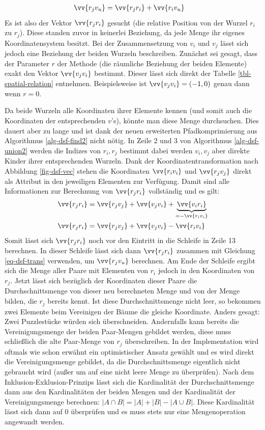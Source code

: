 \documentclass{whswinvcbook}
\begin{document}
\begin{align}\label{eq-dsf-trans}
    \vv{r_j v_u}&=\vv{r_j r_i}+\vv{r_i v_u}
\end{align}
Es ist also der Vektor $\vv{r_j r_i}$ gesucht (die relative Position von der Wurzel $r_i$ zu $r_j$). Diese standen zuvor in keinerlei Beziehung, da jede Menge ihr eigenes Koordinatensystem besitzt. Bei der Zusammensetzung von $v_i$ und $v_j$ lässt sich jedoch eine Beziehung der beiden Wurzeln beschreiben. Zunächst sei gesagt, dass der Parameter $r$ der Methode (die räumliche Beziehung der beiden Elemente) exakt den Vektor $\vv{v_j v_i}$ bestimmt. Dieser lässt sich direkt der Tabelle \ref{tbl-spatial-relation} entnehmen. Beispielsweise ist $\vv{v_j v_i}=(-1,0)$ genau dann wenn $r=0$.

Da beide Wurzeln alle Koordinaten ihrer Elemente kennen (und somit auch die Koordinaten der entsprechenden $v$'s), könnte man diese Menge durchsuchen. Dies dauert aber zu lange und ist dank der neuen erweiterten Pfadkomprimierung aus Algorithmus \ref{alg-dsf-find2} nicht nötig. In Zeile 2 und 3 von Algorithmus \ref{alg-dsf-union2} werden die Indizes von $r_i,r_j$ bestimmt dabei werden $v_i,v_j$ aber direkte Kinder ihrer entsprechenden Wurzeln. Dank der Koordinatentransformation nach Abbildung \ref{fig-dsf-vec} stehen die Koordinaten $\vv{r_i v_i}$ und $\vv{r_j v_j}$ direkt als Attribut in den jeweiligen Elementen zur Verfügung. Damit sind alle Informationen zur Berechnung von $\vv{r_j r_i}$ vollständig und es gilt:
\begin{align}\label{eq-dsf-trans2}
    \vv{r_j r_i}&=\vv{r_j v_j}+\vv{v_j v_i}+\underbrace{\vv{v_i r_i}}_{=-\vv{r_i v_i}}\nonumber\\
    \vv{r_j r_i}&=\vv{r_j v_j}+\vv{v_j v_i}-\vv{r_i v_i}
\end{align}
Somit lässt sich $\vv{r_j r_i}$ noch vor den Eintritt in die Schleife in Zeile 13 berechnen. In dieser Schleife lässt sich dann $\vv{r_j r_i}$ zusammen mit Gleichung \ref{eq-dsf-trans} verwenden, um $\vv{r_j v_u}$ berechnen. Am Ende der Schleife ergibt sich die Menge aller Paare mit Elementen von $r_i$ jedoch in den Koordinaten von $r_j$. Jetzt lässt sich bezüglich der Koordinaten dieser Paare die Durchschnittsmenge von dieser neu berechneten Menge und von der Menge bilden, die $r_j$ bereits kennt. Ist diese Durchschnittsmenge nicht leer, so bekommen zwei Elemente beim Vereinigen der Bäume die gleiche Koordinate. Anders gesagt: Zwei Puzzlestücke würden sich überschneiden. Andernfalls kann bereits die Vereinigungsmenge der beiden Paar-Mengen gebildet werden, diese muss schließlich die alte Paar-Menge von $r_j$ überschreiben. In der Implementation wird oftmals wie schon erwähnt ein optimistischer Ansatz gewählt und es wird direkt die Vereinigungsmenge gebildet, da die Durchschnittsmenge eigentlich nicht gebraucht wird (außer um auf eine nicht leere Menge zu überprüfen). Nach dem Inklusion-Exklusion-Prinzips lässt sich die Kardinalität der Durchschnittsmenge dann aus den Kardinalitäten der beiden Mengen und der Kardinalität der Vereinigungsmenge berechnen: $|A\cap B|=|A|+|B|-|A\cup B|$. Diese Kardinalität lässt sich dann auf $0$ überprüfen und es muss stets nur eine Mengenoperation angewandt werden.
\end{document}
